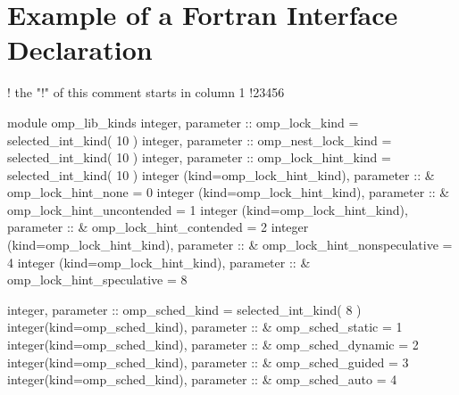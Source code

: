 \section{Example of a Fortran Interface Declaration }
\label{sec:Example of a Fortran Interface Declaration module}
{\small \begin{codepar}
!      the "!" of this comment starts in column 1
!23456

        module omp\_lib\_kinds
        integer, parameter :: omp\_lock\_kind = selected\_int\_kind( 10 )
        integer, parameter :: omp\_nest\_lock\_kind = selected\_int\_kind( 10 )
        integer, parameter :: omp\_lock\_hint\_kind = selected\_int\_kind( 10 )
        integer (kind=omp\_lock\_hint\_kind), parameter :: 
      \&   omp\_lock\_hint\_none = 0
        integer (kind=omp\_lock\_hint\_kind), parameter :: 
      \&   omp\_lock\_hint\_uncontended = 1
        integer (kind=omp\_lock\_hint\_kind), parameter :: 
      \&   omp\_lock\_hint\_contended = 2
        integer (kind=omp\_lock\_hint\_kind), parameter :: 
      \&   omp\_lock\_hint\_nonspeculative = 4 
        integer (kind=omp\_lock\_hint\_kind), parameter :: 
      \&   omp\_lock\_hint\_speculative = 8

        integer, parameter :: omp\_sched\_kind = selected\_int\_kind( 8 ) 
        integer(kind=omp\_sched\_kind), parameter ::
      \&   omp\_sched\_static = 1
        integer(kind=omp\_sched\_kind), parameter ::
      \&   omp\_sched\_dynamic = 2
        integer(kind=omp\_sched\_kind), parameter ::
      \&   omp\_sched\_guided = 3
        integer(kind=omp\_sched\_kind), parameter ::
      \&   omp\_sched\_auto = 4
      

\end{codepar}}
